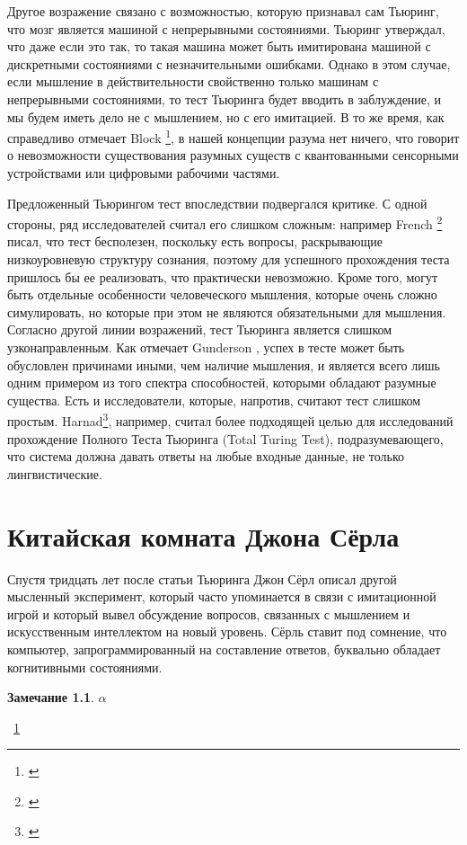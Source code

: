 \documentclass[12pt, specialist, subf, substylefile = spbu.rtx]{disser}
\newtheorem{remark}{Замечание}
\begin{document}
Другое возражение связано с возможностью, которую признавал сам Тьюринг, что мозг является машиной с непрерывными состояниями. Тьюринг утверждал, что даже если это так, то такая машина может быть имитирована машиной с дискретными состояниями с незначительными ошибками. Однако в этом случае, если мышление в действительности свойственно только машинам с непрерывными состояниями, то тест Тьюринга будет вводить в заблуждение, и мы будем иметь дело не с мышлением, но с его имитацией. В то же время, как справедливо отмечает Block \footnote{\cite{Block1981-BLOPAB}}, в нашей концепции разума нет ничего, что говорит о невозможности существования разумных существ с квантованными сенсорными устройствами или цифровыми рабочими частями.


Предложенный Тьюрингом тест впоследствии подвергался критике. С одной стороны, ряд исследователей считал его слишком сложным: например French \footnote{\cite{French1990-FRESAT}} писал, что тест бесполезен, поскольку есть вопросы, раскрывающие низкоуровневую структуру сознания, поэтому для успешного прохождения теста пришлось бы ее реализовать, что практически невозможно. Кроме того, могут быть отдельные особенности человеческого мышления, которые очень сложно симулировать, но которые при этом не являются обязательными для мышления. Согласно другой линии возражений, тест Тьюринга является слишком узконаправленным. Как отмечает Gunderson \cite{Gunderson1964-KEIDLM}, успех в тесте может быть обусловлен причинами иными, чем наличие мышления, и является всего лишь одним примером из того спектра способностей, которыми обладают разумные существа. Есть и исследователи, которые, напротив, считают тест слишком простым. Harnad\footnote{\cite{Harnad1989-HARMMA-3}}, например, считал более подходящей целью для исследований прохождение Полного Теста Тьюринга (Total Turing Test), подразумевающего, что система должна давать ответы на любые входные данные, не только лингвистические.



\chapter{Китайская комната Джона Сёрла}
\label{sec:chinese}

Спустя тридцать лет после статьи Тьюринга Джон Сёрл описал другой мысленный эксперимент, который часто упоминается в связи с имитационной игрой и который вывел обсуждение вопросов, связанных с мышлением и искусственным интеллектом на новый уровень. Сёрль ставит под сомнение, что компьютер, запрограммированный на составление ответов, буквально обладает когнитивными состояниями. 


\cite{Searle80minds}

\begin{remark}
	$\alpha$
\end{remark}

~\ref{sec:chinese} 

\conclusion



\end{document}
